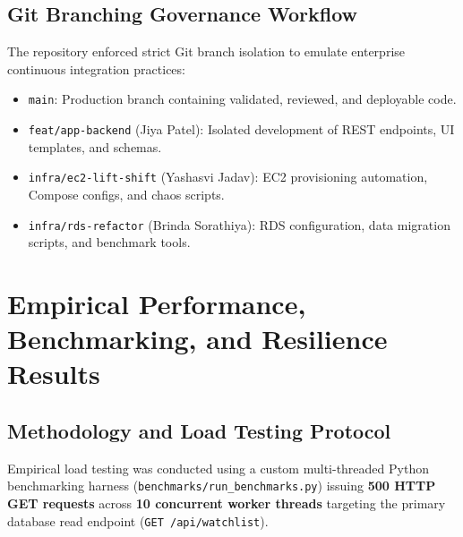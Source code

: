 \documentclass[11pt,a4paper]{article}
\begin{document}
\subsection{Git Branching Governance Workflow}
The repository enforced strict Git branch isolation to emulate enterprise continuous integration practices:
\begin{itemize}[leftmargin=*]
    \item \texttt{main}: Production branch containing validated, reviewed, and deployable code.
    \item \texttt{feat/app-backend} (Jiya Patel): Isolated development of REST endpoints, UI templates, and schemas.
    \item \texttt{infra/ec2-lift-shift} (Yashasvi Jadav): EC2 provisioning automation, Compose configs, and chaos scripts.
    \item \texttt{infra/rds-refactor} (Brinda Sorathiya): RDS configuration, data migration scripts, and benchmark tools.
\end{itemize}

\newpage

\section{Empirical Performance, Benchmarking, and Resilience Results}

\subsection{Methodology and Load Testing Protocol}
Empirical load testing was conducted using a custom multi-threaded Python benchmarking harness (\texttt{benchmarks/run\_benchmarks.py}) issuing \textbf{500 HTTP GET requests} across \textbf{10 concurrent worker threads} targeting the primary database read endpoint (\texttt{GET /api/watchlist}).
\end{document}
